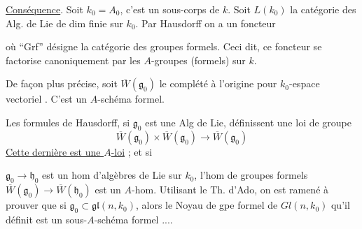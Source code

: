 \uline{Conséquence}. Soit $k_0=A_0$, c'est un sous-corps de $k$. Soit $L(k_0)$ la catégorie des Alg. de Lie de dim finie sur $k_0$. Par Hausdorff on a un foncteur


où ``Grf'' désigne la catégorie des groupes formels. Ceci dit, ce foncteur se factorise canoniquement par les $A$-groupes (formels) sur $k$.

De façon plus précise, soit $\overline W(\mathfrak g_0)$ le complété à l'origine  pour  $k_0$-espace vectoriel  . C'est un $A$-schéma formel.

Les formules de Hausdorff, si $\mathfrak g_0$ est une Alg de Lie, définissent une loi de groupe
\[
 \overline W(\mathfrak g_0)\times\overline W(\mathfrak g_0)\longrightarrow\overline W(\mathfrak g_0)
\]
\uline{Cette dernière est une $A$-loi} ;  et si

$\mathfrak g_0\longrightarrow\mathfrak h_0$ est un hom d'algèbres de Lie sur $k_0$, l'hom de groupes formels $\overline W(\mathfrak g_0)\longrightarrow\overline W(\mathfrak h_0)$ est un $A$-hom. Utilisant le Th. d'Ado, on est ramené à prouver que si $\mathfrak g_0\subset\mathfrak{gl}(n,k_0)$, alors le Noyau de gpe formel de $Gl(n,k_0)$ qu'il définit est un sous-$A$-schéma formel ....
